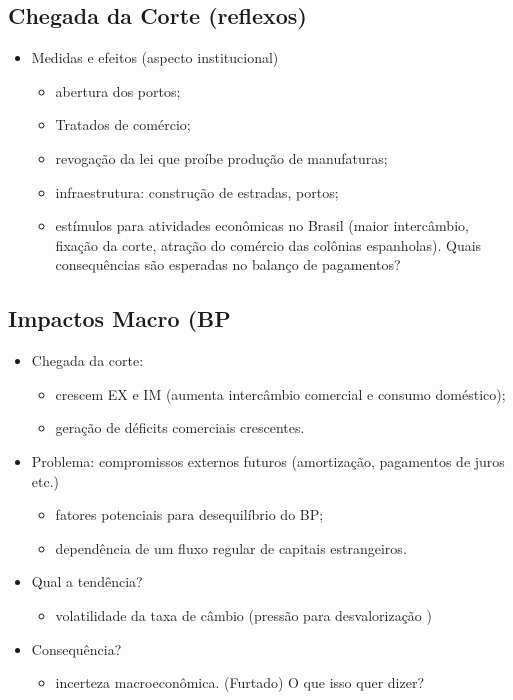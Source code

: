 \documentclass[a4paper,12pt]{article}[abntex2]
\begin{document}
\subsection{\textbf{Chegada da Corte (reflexos)}}
\begin{itemize}
    \item Medidas e efeitos (aspecto institucional)
    \begin{itemize}
        \item abertura dos portos;
        \item Tratados de comércio;
        \item revogação da lei que proíbe produção de manufaturas;
        \item infraestrutura: construção de estradas, portos;
        \item estímulos para atividades econômicas no Brasil (maior intercâmbio, fixação da corte, atração do
comércio das colônias espanholas). 
Quais consequências são esperadas no balanço de pagamentos?
    \end{itemize}
\end{itemize}
\subsection{\textbf{Impactos Macro (BP}}
\begin{itemize}
    \item Chegada da corte: 
    \begin{itemize}
        \item crescem EX e IM (aumenta intercâmbio comercial e consumo doméstico); 
        \item geração de déficits comerciais crescentes.
    \end{itemize}
    \item Problema: compromissos externos futuros (amortização, pagamentos de juros etc.)
    \begin{itemize}
        \item fatores potenciais para desequilíbrio do BP;
        \item dependência de um fluxo regular de capitais estrangeiros.
    \end{itemize}
    \item Qual a tendência? 
    \begin{itemize}
        \item volatilidade da taxa de câmbio (pressão para desvalorização ) 
    \end{itemize}
    \item Consequência? 
    \begin{itemize}
        \item incerteza macroeconômica. (Furtado) O que isso quer dizer?

 
    \end{itemize}
\end{itemize}
\end{document}
